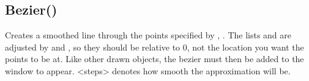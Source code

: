 \documentclass[letterpaper,10pt,english]{sphinxmanual}
\begin{document}
\sphinxAtStartPar
{}

\sphinxAtStartPar
{}

\ignorespaces 

\subsection{Bezier()}
\label{\detokenize{reference/peblobjects:bezier}}\label{\detokenize{reference/peblobjects:index-1}}
\sphinxAtStartPar
{}

\sphinxAtStartPar
{}

\sphinxAtStartPar
Creates a smoothed line through the  points specified by , . The lists  and  are adjusted by   and , so they should be relative to 0, not the location you want the points to be at.  Like other drawn objects, the bezier must then be added to the window to appear. \textless{}steps\textgreater{} denotes how smooth the approximation will be.

\sphinxAtStartPar
{}

\begin{sphinxVerbatim}[commandchars=\\\{\}]
\end{sphinxVerbatim}

\sphinxAtStartPar
{}
\end{document}
